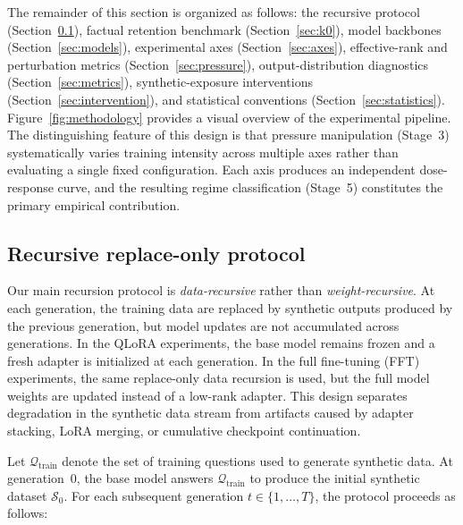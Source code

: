 \documentclass[a4paper,fleqn]{cas-dc}
\begin{document}
The remainder of this section is organized as follows: the recursive protocol
(Section~\ref{sec:protocol}), factual retention benchmark (Section~\ref{sec:k0}), model
backbones (Section~\ref{sec:models}), experimental axes (Section~\ref{sec:axes}),
effective-rank and perturbation metrics (Section~\ref{sec:pressure}),
output-distribution diagnostics (Section~\ref{sec:metrics}), synthetic-exposure
interventions (Section~\ref{sec:intervention}), and statistical conventions
(Section~\ref{sec:statistics}). Figure~\ref{fig:methodology} provides a visual
overview of the experimental pipeline. The distinguishing feature of this design
is that pressure manipulation (Stage~3) systematically varies training intensity
across multiple axes rather than evaluating a single fixed configuration. Each
axis produces an independent dose-response curve, and the resulting regime
classification (Stage~5) constitutes the primary empirical contribution.

\subsection{Recursive replace-only protocol}\label{sec:protocol}

Our main recursion protocol is \textit{data-recursive} rather than
\textit{weight-recursive}. At each generation, the training data are replaced by
synthetic outputs produced by the previous generation, but model updates are not
accumulated across generations. In the QLoRA experiments, the base model remains
frozen and a fresh adapter is initialized at each generation. In the full
fine-tuning (FFT) experiments, the same replace-only data recursion is used, but
the full model weights are updated instead of a low-rank adapter. This design
separates degradation in the synthetic data stream from artifacts caused by
adapter stacking, LoRA merging, or cumulative checkpoint continuation.

Let $\mathcal{Q}_{\mathrm{train}}$ denote the set of training questions used to
generate synthetic data. At generation~0, the base model answers
$\mathcal{Q}_{\mathrm{train}}$ to produce the initial synthetic dataset
$\mathcal{S}_0$. For each subsequent generation
$t \in \{1,\ldots,T\}$, the protocol proceeds as follows:
\end{document}
